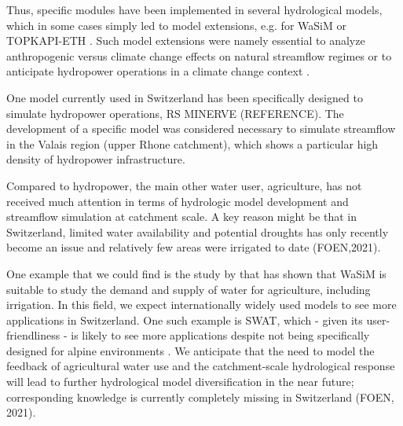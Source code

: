 \documentclass[10pt,a4paper]{article}
\begin{document}
Thus, specific modules have been implemented in several hydrological models, which in some cases simply led to model extensions, e.g. for WaSiM \citep{Verbunt2005} or TOPKAPI-ETH \citep{Fatichi2014}. Such model extensions were namely essential  
to analyze anthropogenic versus climate change effects on natural streamflow regimes \citep{Fatichi2014} or to anticipate hydropower operations in a climate change context \citep{Fatichi2015b, Anghileri2018}. 

One model currently used in Switzerland has been specifically designed to simulate hydropower operations, RS MINERVE (REFERENCE). The development of a specific model was considered necessary to simulate streamflow in the Valais region (upper Rhone catchment), which shows a particular high density of hydropower infrastructure. 
 
Compared to hydropower, the main other water user, agriculture, has not received much  attention in terms of hydrologic model development and streamflow simulation at catchment scale. A key reason might be that in Switzerland, limited water availability and potential droughts has only recently become an issue and relatively few areas were irrigated to date (FOEN,2021).

One example that we could find is the study by \citet{Fuhrer2012} that has shown that WaSiM is suitable to study the demand and supply of water for agriculture, including irrigation. In this field, we expect internationally widely used models to see more applications in Switzerland. One such example is SWAT, which - given its user-friendliness \citep{Abbaspour2007} - is likely to see more applications despite not being specifically designed for alpine environments \citep{Rahman2014, Andrianaki2019}. We anticipate that the need to model the feedback of agricultural water use and the catchment-scale hydrological response will lead to further hydrological model diversification in the near future; corresponding knowledge is currently completely missing in Switzerland (FOEN, 2021).
\end{document}
